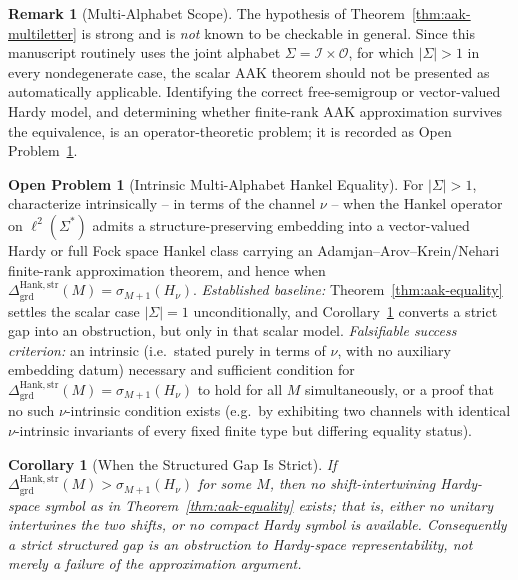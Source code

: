 \documentclass[12pt]{article}
\newtheorem{corollary}[theorem]{Corollary}
\theoremstyle{definition}
\newtheorem{remark}[theorem]{Remark}
\newtheorem{openproblem}[theorem]{Open Problem}
\newcommand{\DHankstr}{\Delta_{\mathrm{grd}}^{\mathrm{Hank,str}}}
\begin{document}
\begin{remark}[Multi-Alphabet Scope]
\label{rem:aak-multialphabet-scope}
The hypothesis of Theorem~\ref{thm:aak-multiletter} is strong and is
\emph{not} known to be checkable in general.  Since this manuscript routinely
uses the joint alphabet $\Sigma=\mathcal I\times\mathcal O$, for which
$|\Sigma|>1$ in every nondegenerate case, the scalar AAK theorem should not be
presented as automatically applicable.  Identifying the correct free-semigroup
or vector-valued Hardy model, and determining whether finite-rank AAK
approximation survives the equivalence, is an operator-theoretic
problem; it is recorded as
Open Problem~\ref{open:hankel-multiletter}.
\end{remark}

\begin{openproblem}[Intrinsic Multi-Alphabet Hankel Equality]
\label{open:hankel-multiletter}
For $|\Sigma|>1$, characterize intrinsically -- in terms of the channel $\nu$
-- when the Hankel operator on $\ell^2(\Sigma^*)$ admits a structure-preserving
embedding into a vector-valued Hardy or full Fock space Hankel class carrying
an Adamjan--Arov--Krein/Nehari finite-rank approximation theorem, and hence
when $\DHankstr(M)=\sigma_{M+1}(H_\nu)$.  \emph{Established baseline:}
Theorem~\ref{thm:aak-equality} settles the scalar case $|\Sigma|=1$
unconditionally, and Corollary~\ref{cor:hankel-strict} converts a strict
gap into an obstruction, but only in that scalar model.
\emph{Falsifiable success criterion:} an intrinsic (i.e.\ stated purely in
terms of $\nu$, with no auxiliary embedding datum) necessary and sufficient
condition for $\DHankstr(M)=\sigma_{M+1}(H_\nu)$ to hold for all $M$
simultaneously, or a proof that no such $\nu$-intrinsic condition exists
(e.g.\ by exhibiting two channels with identical $\nu$-intrinsic invariants
of every fixed finite type but differing equality status).
\end{openproblem}

\begin{corollary}[When the Structured Gap Is Strict]
\label{cor:hankel-strict}
If $\DHankstr(M)>\sigma_{M+1}(H_\nu)$ for some $M$, then no
\emph{shift-intertwining} Hardy-space symbol as in
Theorem~\ref{thm:aak-equality} exists; that is, either no unitary intertwines
the two shifts, or no compact Hardy symbol is available.  Consequently a strict
structured gap is an obstruction to Hardy-space representability, not merely a
failure of the approximation argument.
\end{corollary}
\end{document}
